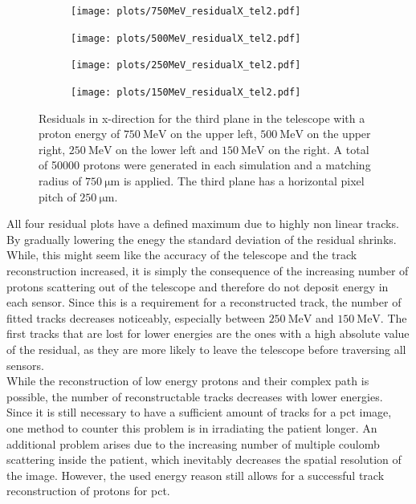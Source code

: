 \begin{figure}
  \hspace{-2.5cm}
  \begin{subfigure}{0.62\textwidth}
      \centering
      \texttt{[image: plots/750MeV\_residualX\_tel2.pdf]}
  \end{subfigure}
  \begin{subfigure}{0.62\textwidth}
      \hspace{0.95cm}
      \texttt{[image: plots/500MeV\_residualX\_tel2.pdf]}
  \end{subfigure}
  \begin{subfigure}{0.62\textwidth}
      \hspace{-2.5cm}
      \texttt{[image: plots/250MeV\_residualX\_tel2.pdf]}
  \end{subfigure}
  \begin{subfigure}{0.62\textwidth}
      \hspace{-1.5cm}
      \texttt{[image: plots/150MeV\_residualX\_tel2.pdf]}
  \end{subfigure}
  \caption{Residuals in x-direction for the third plane in the telescope with a proton energy of $\SI{750}{\mega\eV}$ on the upper left, $\SI{500}{\mega\eV}$ on the
  upper right, $\SI{250}{\mega\eV}$ on the lower left
  and $\SI{150}{\mega\eV}$ on the right. A total of 50000 protons were generated in each simulation and a matching radius of $\SI{750}{\micro\meter}$ is applied. The third plane has
  a horizontal pixel pitch of $\SI{250}{\micro\meter}$.}
  \label{fig:low}
\end{figure}

All four residual plots have a defined maximum due to highly non linear tracks. By gradually lowering the enegy the standard deviation of the residual shrinks. While,
this might seem like the accuracy of the telescope and the track reconstruction increased, it is simply the consequence of the increasing number of protons scattering
out of the telescope and therefore do not deposit energy in each sensor. Since this is a requirement for a reconstructed track, the number of fitted tracks decreases
noticeably, especially between $\SI{250}{\mega\eV}$ and $\SI{150}{\mega\eV}$. The first tracks that are lost for lower energies
are the ones with a high absolute value of the residual, as they are more likely to leave the telescope before traversing all sensors. \\
While the reconstruction of low energy protons and their complex path is possible, the number of reconstructable tracks decreases with lower energies.
Since it is still necessary to have a sufficient amount of tracks for a pct image, one method to counter this problem is in irradiating the patient longer.
An additional problem arises due to the increasing number of multiple coulomb scattering inside the patient, which inevitably decreases the spatial resolution of the image.
However, the used energy reason still allows for a successful track reconstruction of protons for pct.


